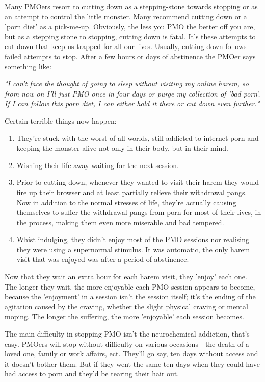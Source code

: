 \documentclass[easypeasy.tex]{subfiles}
\begin{document}
Many PMOers resort to cutting down as a stepping-stone towards stopping or as an attempt to control the little monster. Many recommend cutting down or a 'porn diet' as a pick-me-up. Obviously, the less you PMO the better off you are, but as a stepping stone to stopping, cutting down is fatal. It's these attempts to cut down that keep us trapped for all our lives. Usually, cutting down follows failed attempts to stop. After a few hours or days of abstinence the PMOer says something like:

  \textit{"I can't face the thought of going to sleep without visiting my online harem, so from now on I'll just PMO once in four days or purge my collection of 'bad porn'. If I can follow this porn diet, I can either hold it there or cut down even further."}

  Certain terrible things now happen:

 \begin{enumerate} 
  \item They're stuck with the worst of all worlds, still addicted to internet porn and keeping the monster alive not only in their body, but in their mind.

  \item Wishing their life away waiting for the next session.

  \item Prior to cutting down, whenever they wanted to visit their harem they would fire up their browser and at least partially relieve their withdrawal pangs. Now in addition to the normal stresses of life, they're actually causing themselves to suffer the withdrawal pangs from porn for most of their lives, in the process, making them even more miserable and bad tempered.

  \item Whist indulging, they didn't enjoy most of the PMO sessions nor realising they were using a supernormal stimulus. It was automatic, the only harem visit that was enjoyed was after a period of abstinence.

\end{enumerate}
Now that they wait an extra hour for each harem visit, they 'enjoy' each one. The longer they wait, the more enjoyable each PMO session appears to become, because the 'enjoyment' in a session isn't the session itself; it's the ending of the agitation caused by the craving, whether the slight physical craving or mental moping. The longer the suffering, the more 'enjoyable' each session becomes.

The main difficulty in stopping PMO isn't the neurochemical addiction, that's easy. PMOers will stop without difficulty on various occasions - the death of a loved one, family or work affairs, ect. They'll go say, ten days without access and it doesn't bother them. But if they went the same ten days when they could have had access to porn and they'd be tearing their hair out.
\end{document}
